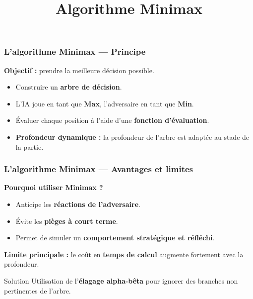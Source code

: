 \title{Algorithme Minimax}
\subtitle{}
\author{}
\institute{}
\date{}
\begin{frame}
	\maketitle
\end{frame}

\begin{frame}
\frametitle{L’algorithme Minimax — Principe}

\textbf{Objectif :} prendre la meilleure décision possible.

\begin{itemize}
    \item Construire un \textbf{arbre de décision}.
    \item L’IA joue en tant que \textbf{Max}, l’adversaire en tant que \textbf{Min}.
    \item Évaluer chaque position à l’aide d’une \textbf{fonction d'évaluation}.
    \item \textbf{Profondeur dynamique :} la profondeur de l’arbre est adaptée au stade de la partie.
\end{itemize}

\begin{center}
\end{center}

\end{frame}

\begin{frame}
\frametitle{L’algorithme Minimax — Avantages et limites}

\textbf{Pourquoi utiliser Minimax ?}

\begin{itemize}
    \item Anticipe les \textbf{réactions de l’adversaire}.
    \item Évite les \textbf{pièges à court terme}.
    \item Permet de simuler un \textbf{comportement stratégique et réfléchi}.
\end{itemize}

\vspace{1em}
\textbf{Limite principale :} le coût en \textbf{temps de calcul} augmente fortement avec la profondeur.

\begin{block}{Solution}
Utilisation de l’\textbf{élagage alpha-bêta} pour ignorer des branches non pertinentes de l’arbre.
\end{block}
\end{frame}
